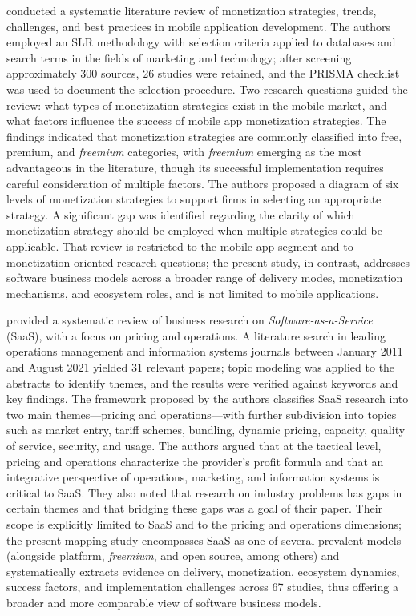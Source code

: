 \documentclass[journal]{IEEEtran}
\begin{document}
\cite{djaruma2023slr} conducted a systematic literature review of monetization strategies, trends, challenges, and best practices in mobile application development. The authors employed an SLR methodology with selection criteria applied to databases and search terms in the fields of marketing and technology; after screening approximately 300 sources, 26 studies were retained, and the PRISMA checklist was used to document the selection procedure. Two research questions guided the review: what types of monetization strategies exist in the mobile market, and what factors influence the success of mobile app monetization strategies. The findings indicated that monetization strategies are commonly classified into free, premium, and \textit{freemium} categories, with \textit{freemium} emerging as the most advantageous in the literature, though its successful implementation requires careful consideration of multiple factors. The authors proposed a diagram of six levels of monetization strategies to support firms in selecting an appropriate strategy. A significant gap was identified regarding the clarity of which monetization strategy should be employed when multiple strategies could be applicable. That review is restricted to the mobile app segment and to monetization-oriented research questions; the present study, in contrast, addresses software business models across a broader range of delivery modes, monetization mechanisms, and ecosystem roles, and is not limited to mobile applications.

\cite{li2022managing} provided a systematic review of business research on \textit{Software-as-a-Service} (SaaS), with a focus on pricing and operations. A literature search in leading operations management and information systems journals between January 2011 and August 2021 yielded 31 relevant papers; topic modeling was applied to the abstracts to identify themes, and the results were verified against keywords and key findings. The framework proposed by the authors classifies SaaS research into two main themes---pricing and operations---with further subdivision into topics such as market entry, tariff schemes, bundling, dynamic pricing, capacity, quality of service, security, and usage. The authors argued that at the tactical level, pricing and operations characterize the provider's profit formula and that an integrative perspective of operations, marketing, and information systems is critical to SaaS. They also noted that research on industry problems has gaps in certain themes and that bridging these gaps was a goal of their paper. Their scope is explicitly limited to SaaS and to the pricing and operations dimensions; the present mapping study encompasses SaaS as one of several prevalent models (alongside platform, \textit{freemium}, and open source, among others) and systematically extracts evidence on delivery, monetization, ecosystem dynamics, success factors, and implementation challenges across 67 studies, thus offering a broader and more comparable view of software business models.
\end{document}

